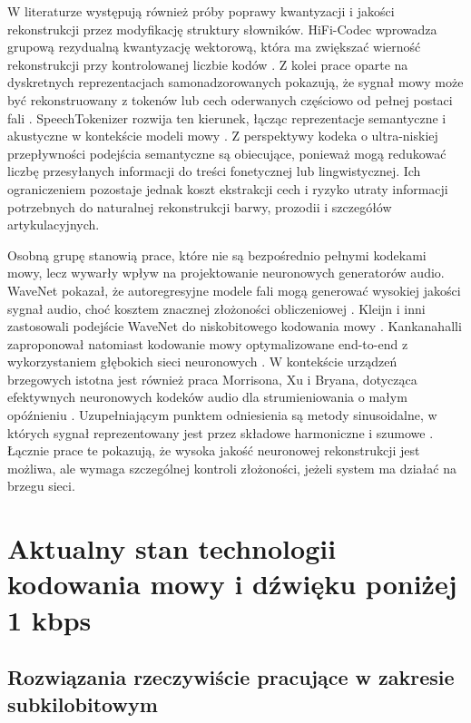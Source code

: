 W literaturze występują również próby poprawy kwantyzacji i jakości rekonstrukcji przez modyfikację struktury słowników. HiFi-Codec wprowadza grupową rezydualną kwantyzację wektorową, która ma zwiększać wierność rekonstrukcji przy kontrolowanej liczbie kodów \cite{Yang2023HiFiCodec}. Z kolei prace oparte na dyskretnych reprezentacjach samonadzorowanych pokazują, że sygnał mowy może być rekonstruowany z tokenów lub cech oderwanych częściowo od pełnej postaci fali \cite{Polyak2021SpeechResynthesis}. SpeechTokenizer rozwija ten kierunek, łącząc reprezentacje semantyczne i akustyczne w kontekście modeli mowy \cite{Zhang2023SpeechTokenizer}. Z perspektywy kodeka o ultra-niskiej przepływności podejścia semantyczne są obiecujące, ponieważ mogą redukować liczbę przesyłanych informacji do treści fonetycznej lub lingwistycznej. Ich ograniczeniem pozostaje jednak koszt ekstrakcji cech i ryzyko utraty informacji potrzebnych do naturalnej rekonstrukcji barwy, prozodii i szczegółów artykulacyjnych.

Osobną grupę stanowią prace, które nie są bezpośrednio pełnymi kodekami mowy, lecz wywarły wpływ na projektowanie neuronowych generatorów audio. WaveNet pokazał, że autoregresyjne modele fali mogą generować wysokiej jakości sygnał audio, choć kosztem znacznej złożoności obliczeniowej \cite{VanDenOord2016WaveNet}. Kleijn i inni zastosowali podejście WaveNet do niskobitowego kodowania mowy \cite{Kleijn2018WaveNetLowRate}. Kankanahalli zaproponował natomiast kodowanie mowy optymalizowane end-to-end z wykorzystaniem głębokich sieci neuronowych \cite{Kankanahalli2018EndToEndSpeechCoding}. W kontekście urządzeń brzegowych istotna jest również praca Morrisona, Xu i Bryana, dotycząca efektywnych neuronowych kodeków audio dla strumieniowania o małym opóźnieniu \cite{Morrison2022EfficientNeuralAudioCodecs}. Uzupełniającym punktem odniesienia są metody sinusoidalne, w których sygnał reprezentowany jest przez składowe harmoniczne i szumowe \cite{Garner2019SinusoidalCoding}. Łącznie prace te pokazują, że wysoka jakość neuronowej rekonstrukcji jest możliwa, ale wymaga szczególnej kontroli złożoności, jeżeli system ma działać na brzegu sieci.

\section{Aktualny stan technologii kodowania mowy i dźwięku poniżej 1 kbps}
\label{sec:stan-technologii-ponizej-1kbps}

\subsection{Rozwiązania rzeczywiście pracujące w zakresie subkilobitowym}
\label{subsec:rozwiazania-subkilobitowe}


